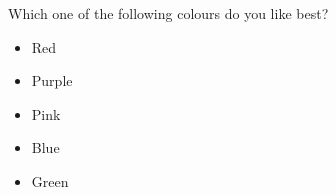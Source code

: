 
\begin{tcolorbox}
Which one of the following colours do you like best?

\begin{itemize}
	\setlength\itemsep{-5pt}
	\item Red
	\item Purple
	\item Pink
	\item Blue
	\item Green
\end{itemize}
\end{tcolorbox}

